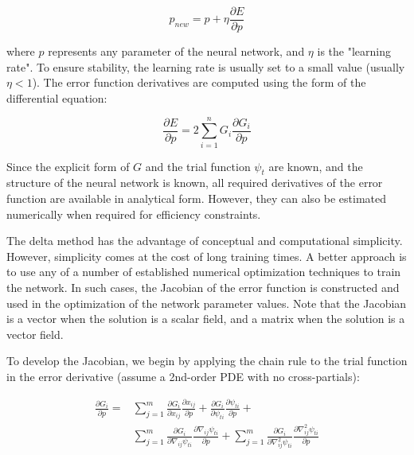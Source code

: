 \documentclass{article}
\begin{document}
\begin{equation}
  p_{new} = p + \eta \frac {\partial E} {\partial p}
  \label{eq:deltarule}
\end{equation}

\noindent where $p$ represents any parameter of the neural network, and $\eta$ is the "learning rate". To ensure stability, the learning rate is usually set to a small value (usually $\eta < 1$). The error function derivatives are computed using the form of the differential equation:

\begin{equation} 
  \frac {\partial E} {\partial p} = 2 \sum_{i=1}^n G_i \frac {\partial G_i} {\partial p}
\end{equation}

\noindent Since the explicit form of $G$ and the trial function $\psi_t$ are known, and the structure of the neural network is known, all required derivatives of the error function are available in analytical form. However, they can also be estimated numerically when required for efficiency constraints.

The delta method has the advantage of conceptual and computational simplicity. However, simplicity comes at the cost of long training times. A better approach is to use any of a number of established numerical optimization techniques to train the network. In such cases, the Jacobian of the error function is constructed and used in the optimization of the network parameter values. Note that the Jacobian is a vector when the solution is a scalar field, and a matrix when the solution is a vector field.

To develop the Jacobian, we begin by applying the chain rule to the trial function in the error derivative (assume a 2nd-order PDE with no cross-partials):

\begin{equation}
\begin{split}
  \frac {\partial G_i} {\partial p} = &\sum_{j=1}^m \frac {\partial G_i} {\partial x_{ij}} \frac {\partial x_{ij}} {\partial p} + \frac {\partial G_i} {\partial \psi_{ti}} \frac {\partial \psi_{ti}} {\partial p} + \\
  &\sum_{j=1}^m \frac {\partial G_i} {\partial \nabla_{ij} \psi_{ti}} \frac {\partial \nabla_{ij} \psi_{ti}} {\partial p} + \sum_{j=1}^m \frac {\partial G_i} {\partial \nabla_{ij}^2 \psi_{ti}} \frac {\partial \nabla_{ij}^2 \psi_{ti}} {\partial p}
\end{split}
\end{equation}
\end{document}
